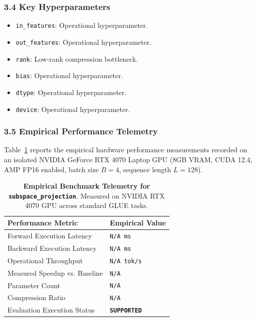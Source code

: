 \subsubsection*{3.4 Key Hyperparameters}
\begin{itemize}
    \item \texttt{in\_features}: Operational hyperparameter.
    \item \texttt{out\_features}: Operational hyperparameter.
    \item \texttt{rank}: Low-rank compression bottleneck.
    \item \texttt{bias}: Operational hyperparameter.
    \item \texttt{dtype}: Operational hyperparameter.
    \item \texttt{device}: Operational hyperparameter.
\end{itemize}

\subsubsection*{3.5 Empirical Performance Telemetry}
Table~\ref{tab:telemetry_subspace_projection} reports the empirical hardware performance measurements recorded on an isolated NVIDIA GeForce RTX 4070 Laptop GPU (8GB VRAM, CUDA 12.4, AMP FP16 enabled, batch size $B=4$, sequence length $L=128$).

\begin{table}[h]
\centering
\small
\caption{\textbf{Empirical Benchmark Telemetry for \texttt{subspace\_projection}}. Measured on NVIDIA RTX 4070 GPU across standard GLUE tasks.}
\label{tab:telemetry_subspace_projection}
\begin{tabularx}{\columnwidth}{lX}
\toprule
\textbf{Performance Metric} & \textbf{Empirical Value} \\
\midrule
Forward Execution Latency & \texttt{N/A ms} \\
Backward Execution Latency & \texttt{N/A ms} \\
Operational Throughput & \texttt{N/A tok/s} \\
Measured Speedup vs. Baseline & \texttt{N/A} \\
Parameter Count & \texttt{N/A} \\
Compression Ratio & \texttt{N/A} \\
Evaluation Execution Status & \textbf{\texttt{SUPPORTED}} \\
\bottomrule
\end{tabularx}
\end{table}

